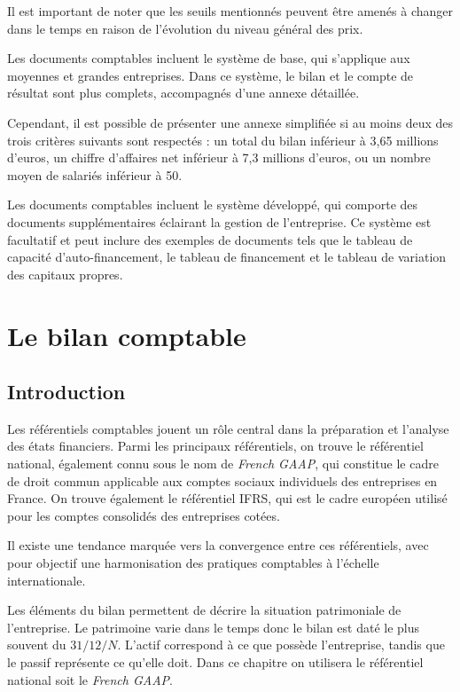 \documentclass[a4paper, 12pt]{report}
\begin{document}
Il est important de noter que les seuils mentionnés peuvent être amenés à changer dans le temps en raison de l'évolution du niveau général des prix.

Les documents comptables incluent le système de base, qui s'applique aux moyennes et grandes entreprises. Dans ce système, le bilan et le compte de résultat sont plus complets, accompagnés d'une annexe détaillée.

Cependant, il est possible de présenter une annexe simplifiée si au moins deux des trois critères suivants sont respectés : un total du bilan inférieur à 3,65 millions d'euros, un chiffre d'affaires net inférieur à 7,3 millions d'euros, ou un nombre moyen de salariés inférieur à 50.

Les documents comptables incluent le système développé, qui comporte des documents supplémentaires éclairant la gestion de l'entreprise. Ce système est facultatif et peut inclure des exemples de documents tels que le tableau de capacité d'auto-financement, le tableau de financement et le tableau de variation des capitaux propres.

\chapter{Le bilan comptable}

\section*{Introduction}

Les référentiels comptables jouent un rôle central dans la préparation et l'analyse des états financiers. Parmi les principaux référentiels, on trouve le référentiel national, également connu sous le nom de \textit{French GAAP}, qui constitue le cadre de droit commun applicable aux comptes sociaux individuels des entreprises en France. On trouve également le référentiel IFRS, qui est le cadre européen utilisé pour les comptes consolidés des entreprises cotées. 

Il existe une tendance marquée vers la convergence entre ces référentiels, avec pour objectif une harmonisation des pratiques comptables à l'échelle internationale. 

Les éléments du bilan permettent de décrire la situation patrimoniale de l'entreprise. Le patrimoine varie dans le temps donc le bilan est daté le plus souvent du \( 31/12/N \). L'actif correspond à ce que possède l'entreprise, tandis que le passif représente ce qu'elle doit. Dans ce chapitre on utilisera le référentiel national soit le \textit{French GAAP}.
\end{document}
